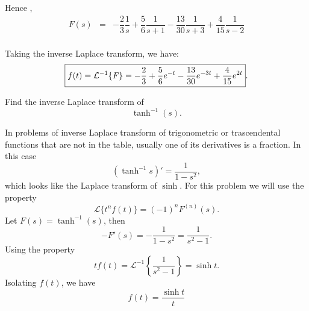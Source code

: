 \documentclass[11pt]{article}
\begin{document}
\begin{solution}
Hence ,
\begin{eqnarray*}
F(s)  & = & -\dfrac{2}{3} \dfrac{1}{s} +\dfrac{5}{6}\dfrac{1}{s+1} -\dfrac{13}{30} \dfrac{1}{s+3} + \dfrac{4}{15}\dfrac{1}{s-2} \\
\end{eqnarray*}

Taking the inverse Laplace transform, we have:
\begin{equation}
\boxed{f(t) = {\cal L}^{-1}\{ {\it F }\} = -\dfrac{2}{3} + \dfrac{5}{6} e^{-t} -\dfrac{13}{30} e^{-3t} + \dfrac{4}{15} e^{2t}}.
\end{equation}
\end{solution}




\begin{problem}
Find the inverse Laplace transform of 
\[\tanh^{-1} (s).\]
\end{problem}
\begin{solution}
In problems of inverse Laplace transform of trigonometric or trascendental functions that are not in the table, usually one of its derivatives is a fraction. In this case
\[(\tanh^{-1}s)'=\frac{1}{1-s^{2}},\]
which looks like the Laplace transform of $\sinh$. For this problem we will use the property
\[\mathcal{L}\{t^{n}f(t)\}=(-1)^{n}F^{(n)}(s).\]
Let $F(s)=\tanh^{-1}(s)$, then
\[-F'(s)=-\frac{1}{1-s^{2}}=\frac{1}{s^{2}-1}.\]
Using the property
\[tf(t) =\mathcal{L}^{-1}\left\{\frac{1}{s^{2}-1}\right\}=\sinh t.\]
Isolating $f(t)$, we have
\[\boxed{f(t)=\frac{\sinh t}{t}}\]
\end{solution}
\end{document}
